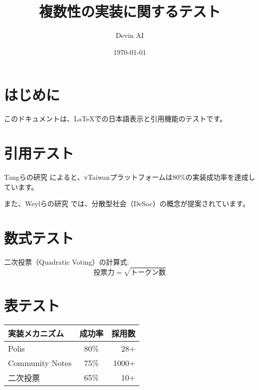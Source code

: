 \documentclass[a4paper,12pt]{article}
\title{複数性の実装に関するテスト}
\author{Devin AI}
\date{\today}
\begin{document}
\maketitle

\section{はじめに}

このドキュメントは、\LaTeX{}での日本語表示と引用機能のテストです。

\section{引用テスト}

Tangらの研究 \citep{vtaiwan2023} によると、vTaiwanプラットフォームは80\%の実装成功率を達成しています。

また、Weylらの研究 \citep{weyl2022decentralized} では、分散型社会（DeSoc）の概念が提案されています。

\section{数式テスト}

二次投票（Quadratic Voting）の計算式:
\[
\text{投票力} = \sqrt{\text{トークン数}}
\]

\section{表テスト}

\begin{tabular}{|l|c|r|}
\hline
実装メカニズム & 成功率 & 採用数 \\
\hline
Polis & 80\% & 28+ \\
Community Notes & 75\% & 1000+ \\
二次投票 & 65\% & 10+ \\
\hline
\end{tabular}



\end{document}
